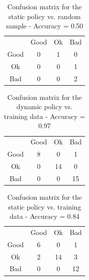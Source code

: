 \documentclass[12pt, conference, compsocconf]{IEEEtran}
\begin{document}
\begin{table}[h!]
\centering
\begin{tabular}{cccc}
                          & Good                   & Ok                     & Bad                    \\ \cline{2-4} 
\multicolumn{1}{c|}{Good} & \multicolumn{1}{c|}{0} & \multicolumn{1}{c|}{1} & \multicolumn{1}{c|}{0} \\ \cline{2-4} 
\multicolumn{1}{c|}{Ok}   & \multicolumn{1}{c|}{0} & \multicolumn{1}{c|}{0} & \multicolumn{1}{c|}{1} \\ \cline{2-4} 
\multicolumn{1}{c|}{Bad}  & \multicolumn{1}{c|}{0} & \multicolumn{1}{c|}{0} & \multicolumn{1}{c|}{2} \\ \cline{2-4} 
\end{tabular}
\vspace{7pt}
\caption{Confusion matrix for the static policy vs. random sample - Accuracy = 0.50}
\label{cm-static-test}
\end{table}

\begin{table}[h!]
\centering
\begin{tabular}{cccc}
                          & Good                   & Ok                      & Bad                     \\ \cline{2-4} 
\multicolumn{1}{c|}{Good} & \multicolumn{1}{c|}{8} & \multicolumn{1}{c|}{0}  & \multicolumn{1}{c|}{1}  \\ \cline{2-4} 
\multicolumn{1}{c|}{Ok}   & \multicolumn{1}{c|}{0} & \multicolumn{1}{c|}{14} & \multicolumn{1}{c|}{0}  \\ \cline{2-4} 
\multicolumn{1}{c|}{Bad}  & \multicolumn{1}{c|}{0} & \multicolumn{1}{c|}{0}  & \multicolumn{1}{c|}{15} \\ \cline{2-4} 
\end{tabular}
\vspace{7pt}
\caption{Confusion matrix for the dynamic policy vs. training data - Accuracy = 0.97}
\label{cm-dynamic-training}
\end{table}

\begin{table}[h!]
\centering
\begin{tabular}{cccc}
                          & Good                   & Ok                      & Bad                     \\ \cline{2-4} 
\multicolumn{1}{c|}{Good} & \multicolumn{1}{c|}{6} & \multicolumn{1}{c|}{0}  & \multicolumn{1}{c|}{1}  \\ \cline{2-4} 
\multicolumn{1}{c|}{Ok}   & \multicolumn{1}{c|}{2} & \multicolumn{1}{c|}{14} & \multicolumn{1}{c|}{3}  \\ \cline{2-4} 
\multicolumn{1}{c|}{Bad}  & \multicolumn{1}{c|}{0} & \multicolumn{1}{c|}{0}  & \multicolumn{1}{c|}{12} \\ \cline{2-4} 
\end{tabular}
\vspace{7pt}
\caption{Confusion matrix for the static policy vs. training data - Accuracy = 0.84}
\label{cm-static-training}
\end{table}
\end{document}
